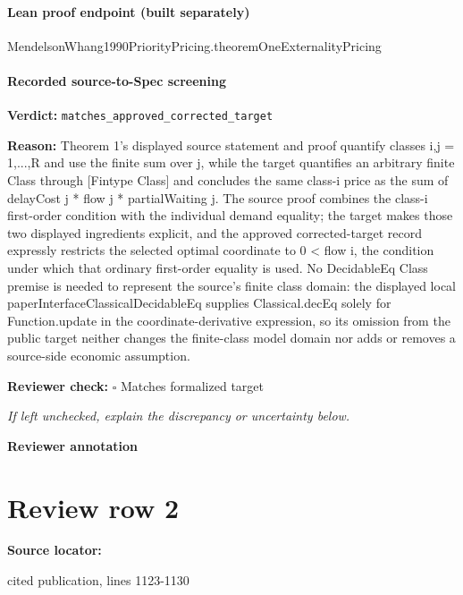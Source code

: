 \documentclass[10pt]{article}
\newcommand{\reviewerbox}{%
  \par\noindent\fbox{\parbox{0.96\linewidth}{\rule{0pt}{0.38in}}}\par
}
\newcommand{\reviewmatch}[1]{%
  \par\noindent\textbf{Reviewer check:} $\square$\; #1\par
  \noindent\emph{If left unchecked, explain the discrepancy or uncertainty below.}\par
}
\begin{document}
\paragraph{Lean proof endpoint (built separately)}\begin{ReviewVerbatim}
MendelsonWhang1990PriorityPricing.theoremOneExternalityPricing
\end{ReviewVerbatim}

\paragraph{Recorded source-to-Spec screening}
\textbf{Verdict:} \texttt{matches\_approved\_corrected\_target}
\\
{\raggedright
\textbf{Reason:} Theorem 1's displayed source statement and proof quantify classes i,j = 1,.\allowbreak{}.\allowbreak{}.\allowbreak{},R and use the finite sum over j, while the target quantifies an arbitrary finite Class through [Fintype Class] and concludes the same class-\allowbreak{}i price as the sum of delayCost j * flow j * partialWaiting j.\allowbreak{} The source proof combines the class-\allowbreak{}i first-\allowbreak{}order condition with the individual demand equality;\allowbreak{} the target makes those two displayed ingredients explicit, and the approved corrected-\allowbreak{}target record expressly restricts the selected optimal coordinate to 0 < flow i, the condition under which that ordinary first-\allowbreak{}order equality is used.\allowbreak{} No DecidableEq Class premise is needed to represent the source's finite class domain:\allowbreak{} the displayed local paperInterfaceClassicalDecidableEq supplies Classical.\allowbreak{}decEq solely for Function.\allowbreak{}update in the coordinate-\allowbreak{}derivative expression, so its omission from the public target neither changes the finite-\allowbreak{}class model domain nor adds or removes a source-\allowbreak{}side economic assumption.\allowbreak{}
\par}
\reviewmatch{Matches formalized target}
\noindent\textbf{Reviewer annotation}\par
\reviewerbox
\clearpage
\hypertarget{source-claim-86fb5cbbc8012c1d}{}
\section*{Review row 2}
\textbf{Source locator:} {\footnotesize\raggedright cited publication, lines 1123-\allowbreak{}1130\par}
\end{document}
